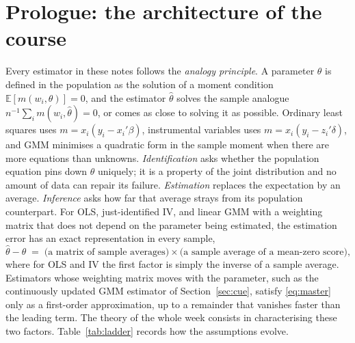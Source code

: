 \documentclass[11pt,a4paper]{article}
\newcommand{\E}{\mathbb{E}}
\begin{document}
\newpage
\thispagestyle{empty}
{\small\tableofcontents}
\newpage

\section*{Prologue: the architecture of the course}

Every estimator in these notes follows the \emph{analogy principle}. A parameter $\theta$ is defined in the population as the solution of a moment condition $\E[m(w_i,\theta)]=0$, and the estimator $\hat\theta$ solves the sample analogue $n^{-1}\sum_i m(w_i,\hat\theta)=0$, or comes as close to solving it as possible. Ordinary least squares uses $m=x_i(y_i-x_i'\beta)$, instrumental variables uses $m=x_i(y_i-z_i'\delta)$, and GMM minimises a quadratic form in the sample moment when there are more equations than unknowns.
\emph{Identification} asks whether the population equation pins down $\theta$ uniquely; it is a property of the joint distribution and no amount of data can repair its failure. \emph{Estimation} replaces the expectation by an average. \emph{Inference} asks how far that average strays from its population counterpart. For OLS, just-identified IV, and linear GMM with a weighting matrix that does not depend on the parameter being estimated, the estimation error has an exact representation in every sample,
\begin{equation}\label{eq:master}
\hat\theta - \theta \;=\; \Big(\text{a matrix of sample averages}\Big)\times\Big(\text{a sample average of a mean-zero score}\Big),
\end{equation}
where for OLS and IV the first factor is simply the inverse of a sample average. Estimators whose weighting matrix moves with the parameter, such as the continuously updated GMM estimator of Section~\ref{sec:cue}, satisfy \eqref{eq:master} only as a first-order approximation, up to a remainder that vanishes faster than the leading term. The theory of the whole week consists in characterising these two factors. Table~\ref{tab:ladder} records how the assumptions evolve.
\end{document}
